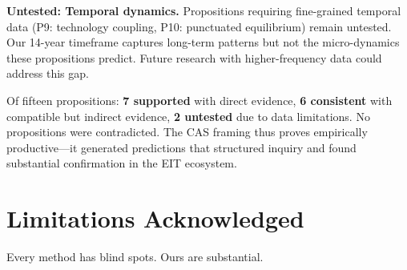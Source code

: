 \documentclass[../main.tex]{subfiles}
\begin{document}
\textbf{Untested: Temporal dynamics.} Propositions requiring fine-grained temporal data (P9: technology coupling, P10: punctuated equilibrium) remain untested. Our 14-year timeframe captures long-term patterns but not the micro-dynamics these propositions predict. Future research with higher-frequency data could address this gap.

\begin{insightbox}
Of fifteen propositions: \textbf{7 supported} with direct evidence, \textbf{6 consistent} with compatible but indirect evidence, \textbf{2 untested} due to data limitations. No propositions were contradicted. The CAS framing thus proves empirically productive---it generated predictions that structured inquiry and found substantial confirmation in the EIT ecosystem.
\end{insightbox}


\section{Limitations Acknowledged}

Every method has blind spots. Ours are substantial.
\end{document}
